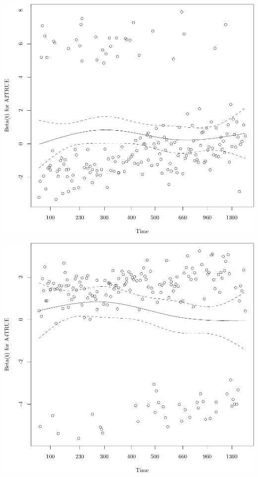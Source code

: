 \documentclass{article}\usepackage[]{graphicx}\usepackage[]{color}
\makeatletter
\def\maxwidth{ %
  \ifdim\Gin@nat@width>\linewidth
    \linewidth
  \else
    \Gin@nat@width
  \fi
}
\newenvironment{knitrout}{}{} %
\makeatother
\begin{document}
\begin{knitrout}
{\centering \includegraphics[width=\maxwidth]{figure/05-eda-ph-check-full-3-6} 

}




{\centering \includegraphics[width=\maxwidth]{figure/05-eda-ph-check-full-3-7} 

}



\end{knitrout}
\end{document}
